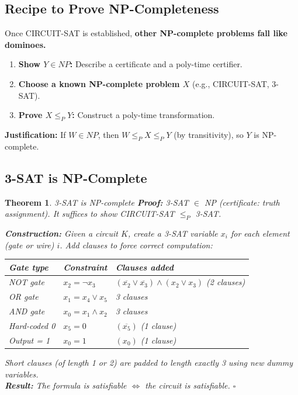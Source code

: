 \documentclass[12pt,a4paper]{report}
\newtheorem{theorem}{Theorem}
\begin{document}
\subsection{Recipe to Prove NP-Completeness}

Once CIRCUIT-SAT is established, \textbf{other NP-complete problems fall like dominoes.}

    \begin{enumerate}
    \item \textbf{Show $Y \in NP$:} Describe a certificate and a poly-time certifier.
    \item \textbf{Choose a known NP-complete problem $X$} (e.g., CIRCUIT-SAT, 3-SAT).
    \item \textbf{Prove $X \leq_P Y$:} Construct a poly-time transformation.
\end{enumerate}
\textbf{Justification:} If $W \in NP$, then $W \leq_P X \leq_P Y$ (by transitivity), so $Y$ is NP-complete.


\subsection{3-SAT is NP-Complete}

\begin{theorem}{3-SAT is NP-complete}{}
\textbf{Proof:} 3-SAT $\in$ NP (certificate: truth assignment). It suffices to show CIRCUIT-SAT $\leq_P$ 3-SAT.

\textbf{Construction:} Given a circuit $K$, create a 3-SAT variable $x_i$ for each element (gate or wire) $i$. Add clauses to force correct computation:

\begin{center}
\begin{tabular}{lll}
\toprule
\textbf{Gate type} & \textbf{Constraint} & \textbf{Clauses added} \\
\midrule
NOT gate & $x_2 = \neg x_3$ & $(\overline{x_2} \vee \overline{x_3}) \wedge (x_2 \vee x_3)$ \quad (2 clauses) \\
OR gate & $x_1 = x_4 \vee x_5$ & 3 clauses \\
AND gate & $x_0 = x_1 \wedge x_2$ & 3 clauses \\
Hard-coded 0 & $x_5 = 0$ & $(\overline{x_5})$ \quad (1 clause) \\
Output = 1 & $x_0 = 1$ & $(x_0)$ \quad (1 clause) \\
\bottomrule
\end{tabular}
\end{center}

Short clauses (of length 1 or 2) are padded to length exactly 3 using new dummy variables.\\
\textbf{Result:} The formula is satisfiable $\iff$ the circuit is satisfiable. $\square$
\end{theorem}
\end{document}
